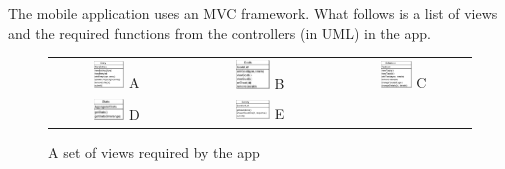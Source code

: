 \documentclass[a4paper, 11pt, titlepage]{article}
\begin{document}
The mobile application uses an MVC framework. What follows is a list of views and the required functions from the controllers (in UML) in the app.

\begin{figure}[H]
	\centering
	\begin{tabular}{ccc}
	\includegraphics[width=0.25\textwidth]{figures/object-models/AppDiary.pdf} A & \includegraphics[width=0.25\textwidth]{figures/object-models/AppGoals.pdf} B & \includegraphics[width=0.25\textwidth]{figures/object-models/AppSchedule.pdf} C \\
	\includegraphics[width=0.25\textwidth]{figures/object-models/AppStats.pdf} D & \includegraphics[width=0.25\textwidth]{figures/object-models/AppSurvey.pdf} E
	\end{tabular}
	\caption{A set of views required by the app}
\end{figure}
\end{document}

